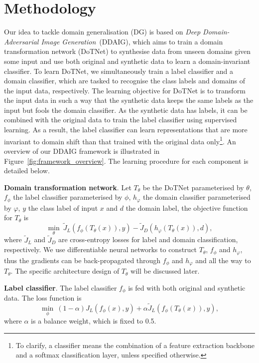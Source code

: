 \documentclass[letterpaper]{article}
\newcommand{\keypoint}[1]{\vspace{0.1cm}\noindent\textbf{#1}}
\begin{document}
\vspace{-0.1cm}
\section{Methodology} \label{sec:methodology}
Our idea to tackle domain generalisation (DG) is based on \emph{Deep Domain-Adversarial Image Generation}~(DDAIG), which aims to train a domain transformation network (DoTNet) to synthesise data from unseen domains given some input and use both original and synthetic data to learn a domain-invariant classifier. To learn DoTNet, we simultaneously train a label classifier and a domain classifier, which are tasked to recognise the class labels and domains of the input data, respectively. The learning objective for DoTNet is to transform the input data in such a way that the synthetic data keeps the same labels as the input but fools the domain classifier. As the synthetic data has labels, it can be combined with the original data to train the label classifier using supervised learning. As a result, the label classifier can learn representations that are more invariant to domain shift than that trained with the original data only\footnote{To clarify, a classifier means the combination of a feature extraction backbone and a softmax classification layer, unless specified otherwise.}. An overview of our DDAIG framework is illustrated in Figure~\ref{fig:framework_overview}. The learning procedure for each component is detailed below.


\keypoint{Domain transformation network}.
Let $T_\theta$ be the DoTNet parameterised by $\theta$, $f_\phi$ the label classifier parameterised by $\phi$, $h_\varphi$ the domain classifier parameterised by $\varphi$, $y$ the class label of input $x$ and $d$ the domain label, the objective function for $T_\theta$ is
\begin{equation} \label{eq:obj_T}
\min_\theta~ \tilde{J}_L (f_\phi (T_\theta(x)), y) - \tilde{J}_D (h_\varphi (T_\theta(x)), d),
\end{equation}
where $\tilde{J}_L$ and $\tilde{J}_D$ are cross-entropy losses for label and domain classification, respectively. We use differentiable neural networks to construct $T_\theta$, $f_\phi$ and $h_\varphi$, thus the gradients can be back-propagated through $f_\phi$ and $h_\varphi$ and all the way to $T_\theta$. The specific architecture  design of $T_\theta$ will be discussed later.

\keypoint{Label classifier}.
The label classifier $f_\phi$ is fed with both original and synthetic data. The loss function is
\begin{equation} \label{eq:obj_L}
\min_\phi~ (1 - \alpha) J_L (f_\phi(x), y) + \alpha \tilde{J}_L (f_\phi (T_\theta(x)), y),
\end{equation}
where $\alpha$ is a balance weight, which is fixed to 0.5.
\end{document}
